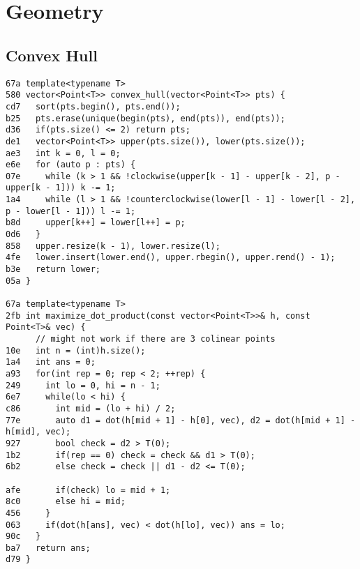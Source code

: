 \documentclass[10pt, a4paper, twoside]{article}
\begin{document}
%
%

\section{Geometry}

\subsection{Convex Hull}
\begin{lstlisting}
67a template<typename T>
580 vector<Point<T>> convex_hull(vector<Point<T>> pts) {
cd7   sort(pts.begin(), pts.end());
b25   pts.erase(unique(begin(pts), end(pts)), end(pts));
d36   if(pts.size() <= 2) return pts;
de1   vector<Point<T>> upper(pts.size()), lower(pts.size());
ae3   int k = 0, l = 0;
e6e   for (auto p : pts) {
07e     while (k > 1 && !clockwise(upper[k - 1] - upper[k - 2], p - upper[k - 1])) k -= 1;
1a4     while (l > 1 && !counterclockwise(lower[l - 1] - lower[l - 2], p - lower[l - 1])) l -= 1;
b8d     upper[k++] = lower[l++] = p;
0d6   }
858   upper.resize(k - 1), lower.resize(l);
4fe   lower.insert(lower.end(), upper.rbegin(), upper.rend() - 1);
b3e   return lower;
05a }

67a template<typename T>
2fb int maximize_dot_product(const vector<Point<T>>& h, const Point<T>& vec) {
      // might not work if there are 3 colinear points
10e   int n = (int)h.size();
1a4   int ans = 0;
a93   for(int rep = 0; rep < 2; ++rep) {
249     int lo = 0, hi = n - 1;
6e7     while(lo < hi) {
c86       int mid = (lo + hi) / 2;
77e       auto d1 = dot(h[mid + 1] - h[0], vec), d2 = dot(h[mid + 1] - h[mid], vec);
927       bool check = d2 > T(0);
1b2       if(rep == 0) check = check && d1 > T(0);
6b2       else check = check || d1 - d2 <= T(0);
     
afe       if(check) lo = mid + 1;
8c0       else hi = mid;
456     }
063     if(dot(h[ans], vec) < dot(h[lo], vec)) ans = lo;
90c   }
ba7   return ans;
d79 }
\end{lstlisting}
\end{document}
